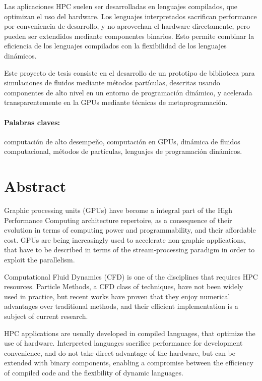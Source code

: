 \documentclass[11pt,spanish]{article}
\begin{document}
Las aplicaciones HPC suelen ser desarrolladas en lenguajes compilados, que
optimizan el uso del hardware.  Los lenguajes interpretados sacrifican
performance por conveniencia de desarrollo, y no aprovechan el hardware
directamente, pero pueden ser extendidos mediante componentes binarios.  Esto
permite combinar la eficiencia de los lenguajes compilados con la flexibilidad
de los lenguajes dinámicos.

Este proyecto de tesis consiste en el desarrollo de un prototipo de biblioteca
para simulaciones de fluidos mediante métodos partículas, descritas usando
componentes de alto nivel en un entorno de programación dinámico, y acelerada
transparentemente en la GPUs mediante técnicas de metaprogramación.

\paragraph{Palabras claves:}
computación de alto desempeño,
computación en GPUs,
dinámica de fluidos computacional,
métodos de partículas,
lenguajes de programación dinámicos.

\newpage
\section*{Abstract}
Graphic processing units (GPUs) have become a integral part
of the High Performance Computing architecture repertoire, as a consequence of
their evolution in terms of computing power and programmability, and their
affordable cost.  GPUs are being increasingly used to accelerate non-graphic
applications, that have to be described in terms of the stream-processing
paradigm in order to exploit the parallelism.

Computational Fluid Dynamics (CFD) is one of the disciplines that requires HPC
resources.  Particle Methods, a CFD class of techniques, have not been widely
used in practice, but recent works have proven that they enjoy numerical
advantages over traditional methods, and their efficient implementation is a
subject of current research.

HPC applications are usually developed in compiled languages, that optimize the
use of hardware.  Interpreted languages sacrifice performance for development
convenience, and do not take direct advantage of the hardware, but can be
extended with binary components, enabling a compromise between the efficiency of
compiled code and the flexibility of dynamic languages.
\end{document}
